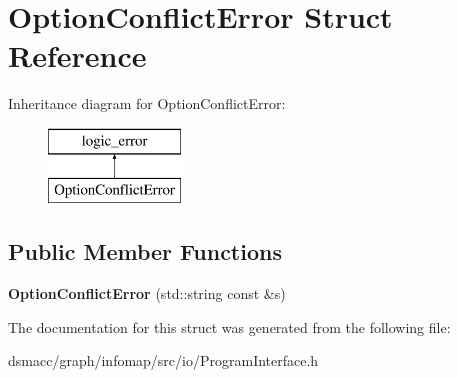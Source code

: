 \hypertarget{structOptionConflictError}{}\section{Option\+Conflict\+Error Struct Reference}
\label{structOptionConflictError}
Inheritance diagram for Option\+Conflict\+Error\+:\begin{figure}[H]
\begin{center}
\leavevmode
\includegraphics[height=2.000000cm]{structOptionConflictError}
\end{center}
\end{figure}
\subsection*{Public Member Functions}
\begin{DoxyCompactItemize}
\item 
\mbox{\label{structOptionConflictError_aeb6622480482e4bf3278bafd38275c62}} 
{\bfseries Option\+Conflict\+Error} (std\+::string const \&s)
\end{DoxyCompactItemize}


The documentation for this struct was generated from the following file\+:\begin{DoxyCompactItemize}
\item 
dsmacc/graph/infomap/src/io/Program\+Interface.\+h\end{DoxyCompactItemize}
